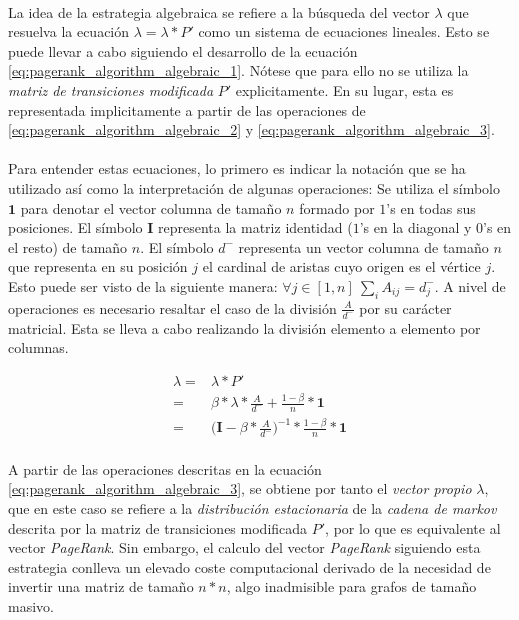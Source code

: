 \documentclass{subfiles}
\begin{document}
        \paragraph{}
        La idea de la estrategia algebraica se refiere a la búsqueda del vector $\lambda$ que resuelva la ecuación $\lambda = \lambda * P'$ como un sistema de ecuaciones lineales. Esto se puede llevar a cabo siguiendo el desarrollo de la ecuación \eqref{eq:pagerank_algorithm_algebraic_1}. Nótese que para ello no se utiliza la \emph{matriz de transiciones modificada} $P'$ explicitamente. En su lugar, esta es representada implicitamente a partir de las operaciones de \eqref{eq:pagerank_algorithm_algebraic_2} y \eqref{eq:pagerank_algorithm_algebraic_3}.

        \paragraph{}
        Para entender estas ecuaciones, lo primero es indicar la notación que se ha utilizado así como la interpretación de algunas operaciones: Se utiliza el símbolo $\boldsymbol{1}$ para denotar el vector columna de tamaño $n$ formado por $1$'s en todas sus posiciones. El símbolo $\boldsymbol{I}$ representa la matriz identidad ($1$'s en la diagonal y $0$'s en el resto) de tamaño $n$. El símbolo $d^-$ representa un vector columna de tamaño $n$ que representa en su posición $j$ el cardinal de aristas cuyo origen es el vértice $j$. Esto puede ser visto de la siguiente manera: $\forall j \in [1,n] \ \sum_i A_{ij} = d^{-}_{j}$. A nivel de operaciones es necesario resaltar el caso de la división $\frac{A}{d^-}$ por su carácter matricial. Esta se lleva a cabo realizando la división elemento a elemento por columnas.

        \begin{align}
          \label{eq:pagerank_algorithm_algebraic_1}
          \lambda =& \lambda * P' \\
          \label{eq:pagerank_algorithm_algebraic_2}
                  =& \beta * \lambda * \frac{A}{d^-} + \frac{1-\beta}{n}*\boldsymbol{1} \\
          \label{eq:pagerank_algorithm_algebraic_3}
                  =& \bigg(\boldsymbol{I} - \beta * \frac{A}{d^-}\bigg)^{-1} * \frac{1-\beta}{n}*\boldsymbol{1}
        \end{align}

        \paragraph{}
        A partir de las operaciones descritas en la ecuación \eqref{eq:pagerank_algorithm_algebraic_3}, se obtiene por tanto el \emph{vector propio} $\lambda$, que en este caso se refiere a la \emph{distribución estacionaria} de la \emph{cadena de markov} descrita por la matriz de transiciones modificada $P'$, por lo que es equivalente al vector \emph{PageRank}. Sin embargo, el calculo del vector \emph{PageRank} siguiendo esta estrategia conlleva un elevado coste computacional derivado de la necesidad de invertir una matriz de tamaño $n*n$, algo inadmisible para grafos de tamaño masivo. 
\end{document}
